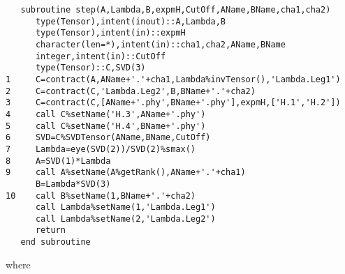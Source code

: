 \documentclass[preprint,3p,times,preprint,showpacs,amsmath,superscriptaddress,floatfix]{elsarticle}
\begin{document}
\begin{verbatim}
   subroutine step(A,Lambda,B,expmH,CutOff,AName,BName,cha1,cha2)
      type(Tensor),intent(inout)::A,Lambda,B
      type(Tensor),intent(in)::expmH
      character(len=*),intent(in)::cha1,cha2,AName,BName
      integer,intent(in)::CutOff
      type(Tensor)::C,SVD(3)
1     C=contract(A,AName+'.'+cha1,Lambda%invTensor(),'Lambda.Leg1')
2     C=contract(C,'Lambda.Leg2',B,BName+'.'+cha2)
3     C=contract(C,[AName+'.phy',BName+'.phy'],expmH,['H.1','H.2'])
4     call C%setName('H.3',AName+'.phy')
5     call C%setName('H.4',BName+'.phy')
6     SVD=C%SVDTensor(AName,BName,CutOff)
7     Lambda=eye(SVD(2))/SVD(2)%smax()
8     A=SVD(1)*Lambda
9     call A%setName(A%getRank(),AName+'.'+cha1)
      B=Lambda*SVD(3)
10    call B%setName(1,BName+'.'+cha2)
      call Lambda%setName(1,'Lambda.Leg1')
      call Lambda%setName(2,'Lambda.Leg2')
      return
   end subroutine
\end{verbatim}
%
where
%
\end{document}
